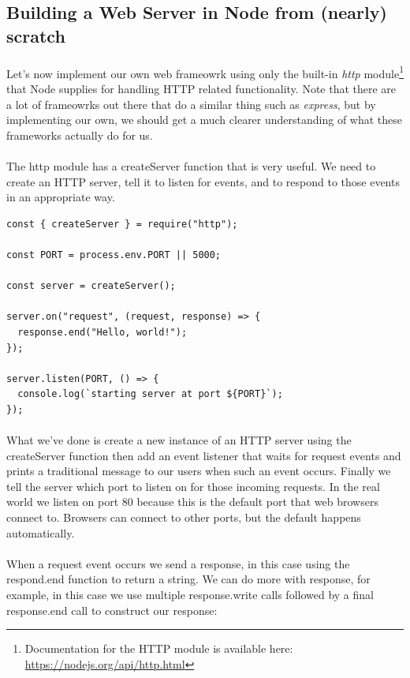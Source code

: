 \documentclass[10pt, a4paper, twosize]{article}
\begin{document}
\subsection{Building a Web Server in Node from (nearly) scratch}
\paragraph{} Let's now implement our own web frameowrk using only the built-in \emph{http} module\footnote{Documentation for the HTTP module is available here: \url{https://nodejs.org/api/http.html}} that Node supplies for handling HTTP related functionality. Note that there are a lot of frameowrks out there that do a similar thing such as \emph{express}, but by implementing our own, we should get a much clearer understanding of what these frameworks actually do for us.

\paragraph{} The http module has a createServer function that is very useful. We need to create an HTTP server, tell it to listen for events, and to respond to those events in an appropriate way.


\begin{lstlisting}
const { createServer } = require("http");

const PORT = process.env.PORT || 5000;

const server = createServer();

server.on("request", (request, response) => {
  response.end("Hello, world!");
});

server.listen(PORT, () => {
  console.log(`starting server at port ${PORT}`);
});
\end{lstlisting}

\paragraph{} What we've done is create a new instance of an HTTP server using the createServer function then add an event listener that waits for request events and prints a traditional message to our users when such an event occurs. Finally we tell the server which port to listen on for those incoming requests. In the real world we listen on port 80 because this is the default port that web browsers connect to. Browsers can connect to other ports, but the default happens automatically.

\paragraph{} When a request event occurs we send a response, in this case using the respond.end function to return a string. We can do more with response, for example, in this case we use multiple response.write calls followed by a final response.end call to construct our response:
\end{document}

